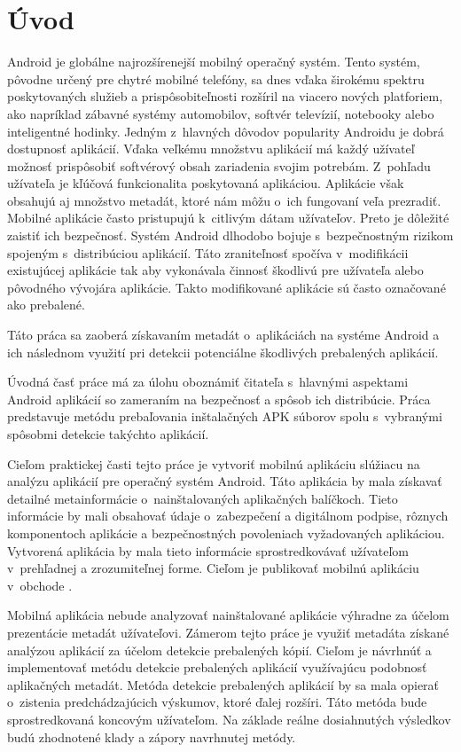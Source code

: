 \chapter*{Úvod}
 Android je globálne najrozšírenejší mobilný operačný systém. Tento systém, pôvodne určený pre chytré mobilné telefóny, sa dnes vďaka širokému spektru poskytovaných služieb a prispôsobiteľnosti rozšíril na viacero nových platforiem, ako napríklad zábavné systémy automobilov, softvér televízií, notebooky alebo inteligentné hodinky. Jedným z~hlavných dôvodov popularity Androidu je dobrá dostupnosť aplikácií. Vďaka veľkému množstvu aplikácií má každý užívateľ možnosť prispôsobiť softvérový obsah zariadenia svojim potrebám. Z~pohľadu užívateľa je kľúčová funkcionalita poskytovaná aplikáciou. Aplikácie však obsahujú aj množstvo metadát, ktoré nám môžu o~ich fungovaní veľa prezradiť. Mobilné aplikácie často pristupujú k~citlivým dátam užívateľov. Preto je dôležité zaistiť ich bezpečnosť. Systém Android dlhodobo bojuje s~bezpečnostným rizikom spojeným s~distribúciou aplikácií. Táto zraniteľnosť spočíva v~modifikácii existujúcej aplikácie tak aby vykonávala činnosť škodlivú pre užívateľa alebo pôvodného vývojára aplikácie. Takto modifikované aplikácie sú často označované ako prebalené.

Táto práca sa zaoberá získavaním metadát o~aplikáciách na systéme Android a ich následnom využití pri detekcii potenciálne škodlivých prebalených aplikácií.

Úvodná časť práce má za úlohu oboznámiť čitateľa s~hlavnými aspektami Android aplikácií so zameraním na bezpečnosť a spôsob ich distribúcie. Práca predstavuje metódu prebaľovania inštalačných APK súborov spolu s~vybranými spôsobmi detekcie takýchto aplikácií.

Cieľom praktickej časti tejto práce je vytvoriť mobilnú aplikáciu slúžiacu na analýzu aplikácií pre operačný systém Android. Táto aplikácia by mala získavať detailné metainformácie o~nainštalovaných aplikačných balíčkoch. Tieto informácie by mali obsahovať údaje o~zabezpečení a digitálnom podpise, rôznych komponentoch aplikácie a bezpečnostných povoleniach vyžadovaných aplikáciou. Vytvorená aplikácia by mala tieto informácie sprostredkovávať užívateľom v~prehľadnej a zrozumiteľnej forme. Cieľom je publikovať mobilnú aplikáciu v~obchode .

Mobilná aplikácia nebude analyzovať nainštalované aplikácie výhradne za účelom prezentácie metadát užívateľovi. Zámerom tejto práce je využiť metadáta získané analýzou aplikácií za účelom detekcie prebalených kópií. Cieľom je návrhnúť a implementovať metódu detekcie prebalených aplikácií využívajúcu podobnosť aplikačných metadát. Metóda detekcie prebalených aplikácií by sa mala opierať o~zistenia predchádzajúcich výskumov, ktoré ďalej rozšíri. Táto metóda bude sprostredkovaná koncovým užívateľom. Na základe reálne dosiahnutých výsledkov budú zhodnotené klady a zápory navrhnutej metódy.

